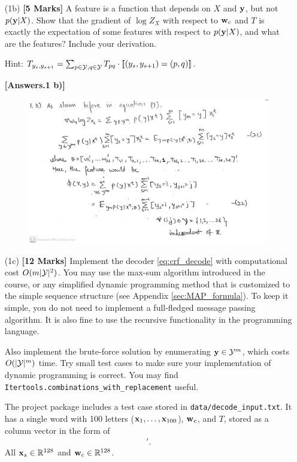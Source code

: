 \documentclass[11pt]{report}
\begin{document}
\begin{itemize}
	\item[(1b)] {\bf [5 Marks]} A feature is a function that depends on $X$ and $\mathbf{\boldsymbol{y}}$, but not $p(\mathbf{\boldsymbol{y}}|X)$. Show that the gradient of $\log Z_X$ with respect to $\mathbf{\boldsymbol{w}}_c$ and $T$ is exactly the expectation of some features with respect to $p(\mathbf{\boldsymbol{y}} | X)$, and what are the features? Include your derivation.
	
	Hint: $T_{y_s, y_{s+1}} = \sum_{p \in \mathcal{Y}, q \in \mathcal{Y}} T_{pq} \cdot \llbracket (y_s, y_{s+1}) = (p,q)  \rrbracket$.
	
	{\bf [Answers.1 b)]} 
	\begin{figure}[H]
    \includegraphics[width=14cm]{Figures/1b.jpeg}
    \centering
    \end{figure}
    
	\item[(1c)] {\bf [12 Marks]} Implement the decoder \eqref{eq:crf_decode} with computational cost $O(m|\mathcal{Y}|^2)$.
	You may use the max-sum algorithm introduced in the course, or any simplified dynamic programming method that is customized to the simple sequence structure (see Appendix \ref{sec:MAP_formula}). 
	To keep it simple, you do not need to implement a full-fledged message passing algorithm.
	It is also fine to use the recursive functionality in the programming language.
	
	Also implement the brute-force solution by enumerating $\mathbf{\boldsymbol{y}} \in \mathcal{Y}^m$, which costs $O(|\mathcal{Y}|^m)$ time.  Try small test cases to make sure your implementation of dynamic programming is correct.
	You may find \verb#Itertools.combinations_with_replacement# useful.
	
	The project package includes a test case stored in \verb#data/decode_input.txt#.
	It has a single word with 100 letters ($\mathbf{\boldsymbol{x}}_1, \ldots, \mathbf{\boldsymbol{x}}_{100}$), $\mathbf{\boldsymbol{w}}_c$, and $T$, stored as a column vector in the form of
	\begin{align}
		[\xvec'_1, \ldots, \xvec'_{100}, \wvec'_1, \ldots, \wvec'_{26}, T_{1,1}, T_{1,2}, \ldots, T_{1, 26}, T_{2,1}, \ldots, T_{2, 26}, \ldots, T_{26,1}, \ldots, T_{26, 26}]'.
	\end{align}
	All $\mathbf{\boldsymbol{x}}_s \in \mathbb{R}^{128}$ and $\mathbf{\boldsymbol{w}}_c \in \mathbb{R}^{128}$.
	

\end{itemize}
\end{document}
